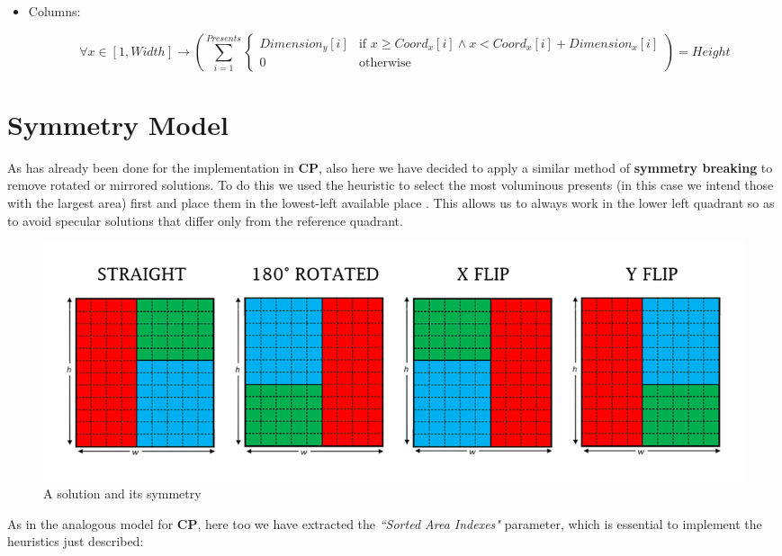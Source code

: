 \begin{itemize}
\begin{itemize}
\begin{adjustwidth}{-3.3cm}{}
\begin{equation*}
{\begin{cases}
				\end{cases}
			}) = Width
		\end{equation*}\end{adjustwidth}
		\item[] Columns:
		\begin{adjustwidth}{-3.3cm}{}\begin{equation*} 
			\forall x \in [1, Width] \rightarrow (\sum_{i = 1}^{Presents}{
				\begin{cases}
					Dimension_y[i] & \text{if } x \geq Coord_x[i] \wedge x < Coord_x[i] + Dimension_x[i] \\
					0 & \text{otherwise}
				\end{cases}
			}) = Height
		\end{equation*}\end{adjustwidth}
	\end{itemize}
\end{itemize}



\newpage
\section{Symmetry Model}
As has already been done for the implementation in \textbf{CP}, also here we have decided to apply a similar method of \textbf{symmetry breaking} to remove rotated or mirrored solutions. To do this we used the heuristic to select the most voluminous presents (in this case we intend those with the largest area) first and place them in the lowest-left available place \cite{binpack, algdesign}. This allows us to always work in the lower left quadrant so as to avoid specular solutions that differ only from the reference quadrant.

\begin{figure}[ht]
	\centering
	\includegraphics[width=\textwidth]{images/simple_simmetry.png}
	\caption{A solution and its symmetry}
	\label{fig:overlaps}
\end{figure}

As in the analogous model for \textbf{CP}, here too we have extracted the \textit{``Sorted Area Indexes"} parameter, which is essential to implement the heuristics just described:

